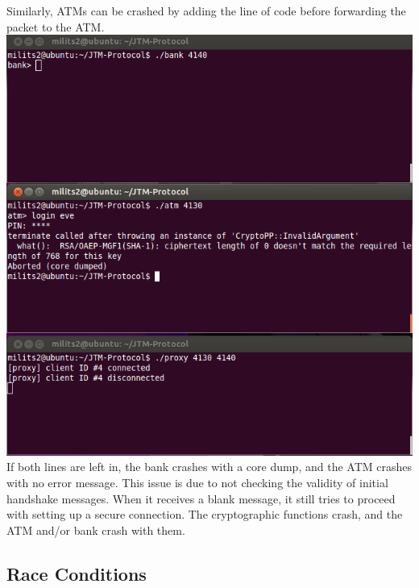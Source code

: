 \documentclass{article}
\begin{document}
Similarly, ATMs can be crashed by adding the line of code before forwarding the packet to the ATM.
\\
\includegraphics[scale=0.85]{crashATM.png}
\\
If both lines are left in, the bank crashes with a core dump, and the ATM crashes with no error message. This issue is due to not checking the validity of initial handshake messages. When it receives a blank message, it still tries to proceed with setting up a secure connection. The cryptographic functions crash, and the ATM and/or bank crash with them.

\subsection{Race Conditions}
\end{document}
